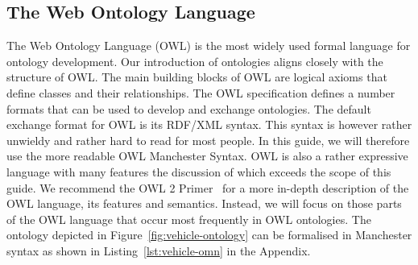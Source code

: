 \subsection{The Web Ontology Language}
\label{ssec:ontology-languages}

The Web Ontology Language (OWL) is the most widely used formal language for ontology development. Our introduction of ontologies aligns closely with the structure of OWL. The main building blocks of OWL are logical axioms that define classes and their relationships. The OWL specification defines a number formats that can be used to develop and exchange ontologies. The default exchange format for OWL is its RDF/XML syntax. This syntax is however rather unwieldy and rather hard to read for most people. In this guide, we will therefore use the more readable OWL Manchester Syntax. OWL is also a rather expressive language with many features the discussion of which exceeds the scope of this guide. We recommend the OWL 2 Primer~\cite{owlprimer} for a more in-depth description of the OWL language, its features and semantics. 
Instead, we will focus on those parts of the OWL language that occur most frequently in OWL ontologies. The ontology depicted in Figure~\ref{fig:vehicle-ontology} can be formalised in Manchester syntax as shown in Listing~\ref{lst:vehicle-omn} in the Appendix.
  
